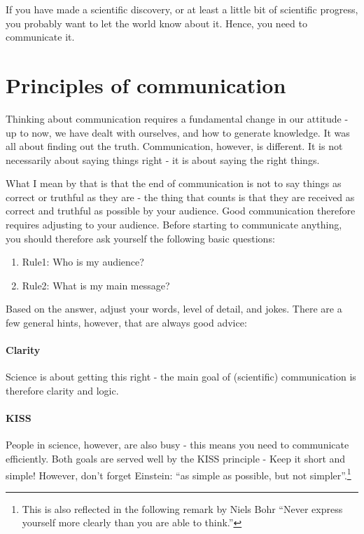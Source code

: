 \documentclass{tufte-book}
\begin{document}
If you have made a scientific discovery, or at least a little bit of scientific progress, you probably want to let the world know about it. Hence, you need to communicate it.

\section{Principles of communication}

Thinking about communication requires a fundamental change in our attitude - up to now, we have dealt with ourselves, and how to generate knowledge. It was all about finding out the truth. Communication, however, is different. It is not necessarily about saying things right - it is about saying the right things.

What I mean by that is that the end of communication is not to say things as correct or truthful as they are - the thing that counts is that they are received as correct and truthful as possible by your audience. Good communication therefore requires adjusting to your audience. Before starting to communicate anything, you should therefore ask yourself the following basic questions:


\begin{enumerate}
\item Rule1: Who is my audience?
\item Rule2: What is my main message?
\end{enumerate}

Based on the answer, adjust your words, level of detail, and jokes. There are a few general hints, however, that are always good advice:

\paragraph{Clarity} Science is about getting this right - the main goal of (scientific) communication is therefore clarity and logic.

\paragraph{KISS} People in science, however, are also busy - this means you need to communicate efficiently. Both goals are served well by the KISS principle - Keep it short and simple! However, don't forget Einstein: “as simple as possible, but not simpler”.\footnote{This is also reflected in the following remark by Niels Bohr “Never express yourself more clearly than you are able to think.”}
\end{document}
